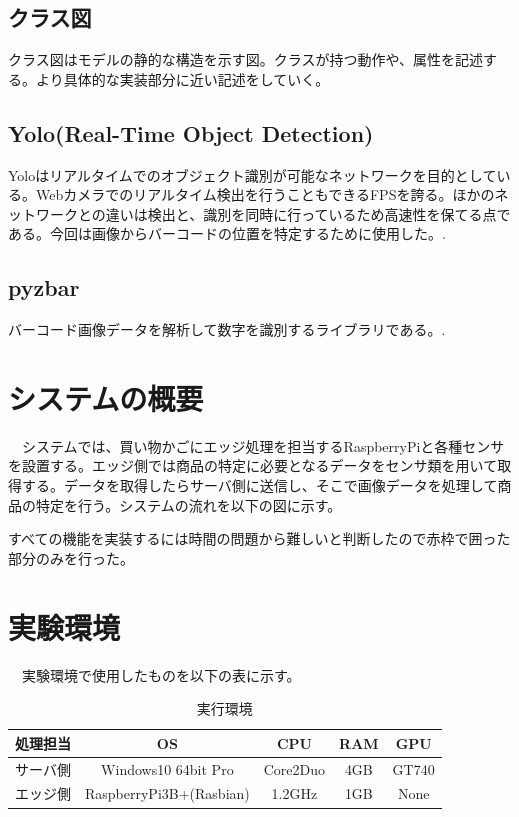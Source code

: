 \subsection*{クラス図}
クラス図はモデルの静的な構造を示す図。クラスが持つ動作や、属性を記述する。より具体的な実装部分に近い記述をしていく。

\subsection*{Yolo(Real-Time Object Detection)}
Yoloはリアルタイムでのオブジェクト識別が可能なネットワークを目的としている。Webカメラでのリアルタイム検出を行うこともできるFPSを誇る。ほかのネットワークとの違いは検出と、識別を同時に行っているため高速性を保てる点である。今回は画像からバーコードの位置を特定するために使用した。\cite{yolo}.


\subsection*{pyzbar}
バーコード画像データを解析して数字を識別するライブラリである。\cite{pyzbar}.

\section{システムの概要}
　システムでは、買い物かごにエッジ処理を担当するRaspberryPiと各種センサを設置する。エッジ側では商品の特定に必要となるデータをセンサ類を用いて取得する。データを取得したらサーバ側に送信し、そこで画像データを処理して商品の特定を行う。システムの流れを以下の図に示す。

すべての機能を実装するには時間の問題から難しいと判断したので赤枠で囲った部分のみを行った。


\section{実験環境}
　実験環境で使用したものを以下の表に示す。

\begin{table}[htb]
\begin{center}
\caption{実行環境}
\begin{tabular}{|c|c|c|c|c|} \hline
処理担当 & OS & CPU & RAM & GPU \\ \hline
サーバ側 & Windows10 64bit Pro & Core2Duo & 4GB & GT740 \\ \hline
エッジ側 & RaspberryPi3B+(Rasbian) & 1.2GHz & 1GB & None \\ \hline
\end{tabular}
\label{spec}
	\end{center}
\end{table}


